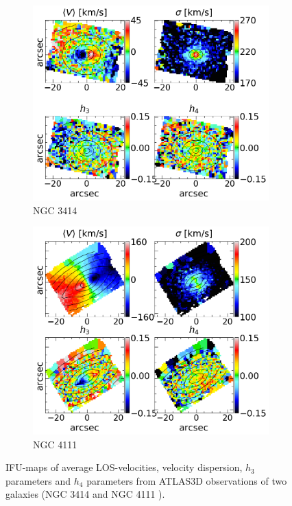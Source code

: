 \documentclass[english, oneside]{HYgradu}
\begin{document}
\begin{figure}
	\centering
	\begin{subfigure}[b]{0.49\textwidth}
		\includegraphics[width=\textwidth]{NGC3414_r6_voronoi.png}
		\caption{NGC 3414}
	\end{subfigure}
	\begin{subfigure}[b]{0.49\textwidth}
		\includegraphics[width=\textwidth]{NGC4111_r1_voronoi.png}
		\caption{NGC 4111}
	\end{subfigure}
	\caption{IFU-maps of average LOS-velocities, velocity dispersion, $h_3$ parameters and $h_4$ parameters from ATLAS3D observations of two galaxies (NGC 3414 \citep{Emsellem2004} and NGC 4111 \citep{Cappellari2011}).}
\end{figure}
\end{document}
